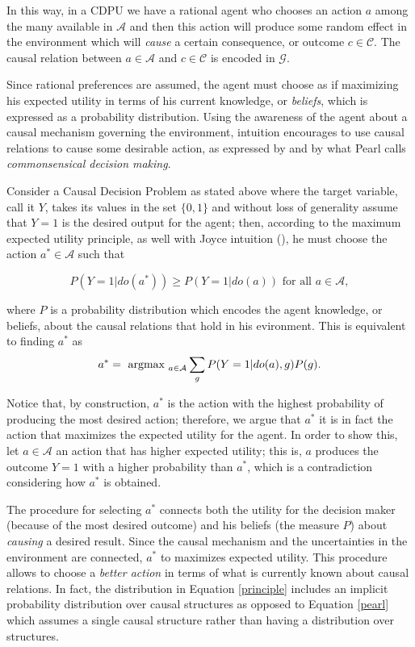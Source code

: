 \documentclass[letterpaper]{article}
\begin{document}
In this way, in a CDPU we have a rational agent who chooses an action $a$ among the many available in $\mathcal{A}$ and then this action will produce some random effect in the environment which will \textit{cause} a certain consequence, or outcome $c \in \mathcal{C}$. The causal relation between $a \in \mathcal{A}$ and $c \in \mathcal{C}$ is encoded in $\mathcal{G}$.

Since rational preferences are assumed, the agent must choose as if maximizing his expected utility in terms of his current knowledge, or \textit{beliefs}, which is expressed as a probability distribution. Using the awareness of the agent about a causal mechanism governing the environment, intuition encourages to use causal relations to cause some desirable action, as expressed by \cite{joyce1999foundations} and by what Pearl calls \textit{commonsensical decision making}.

Consider a Causal Decision Problem as stated above where the target variable, call it $Y$, takes its values in the set $\{0,1\}$ and without loss of generality assume that $Y=1$ is the desired output for the agent; then, according to the maximum expected utility principle, as well with Joyce intuition (\cite{joyce1999foundations}), he must choose the action $a^\ast \in \mathcal{A}$ such that

\[ P(Y=1 | do(a^\ast)) \geq P(Y=1 | do(a)) \textrm{ for all } a \in \mathcal{A}, \]

where $P$ is a probability distribution which encodes the agent knowledge, or beliefs, about the causal relations that hold in his evironment. This is equivalent to finding $a^\ast$  as
\begin{equation}{\label{principle}}
 a^\ast = \textrm{ argmax }_{a \in \mathcal{A}}\sum_g P(Y=1 | do(a), g)P(g).
\end{equation}

Notice that, by construction, $a^\ast$ is the action with the highest probability of producing the most desired action; therefore, we argue that $a^\ast$ it is in fact the action that maximizes the expected utility for the agent. In order to show this, let $a \in \mathcal{A}$ an action that has higher expected utility; this is, $a$ produces the outcome $Y=1$ with a higher probability than $a^\ast$, which is a contradiction considering how $a^\ast$ is obtained.

The procedure for selecting $a^\ast$ connects both the utility for the decision maker (because of the most desired outcome) and his beliefs (the measure $P$) about \textit{causing} a desired result. Since the causal mechanism and the uncertainties in the environment are connected, $a^\ast$ to maximizes expected utility. This procedure allows to choose a \textit{better action} in terms of what is currently known about causal relations. In fact, the distribution in Equation \ref{principle} includes an implicit probability distribution over causal structures as opposed to Equation \ref{pearl} which assumes a single causal structure rather than having a distribution over structures.
\end{document}

